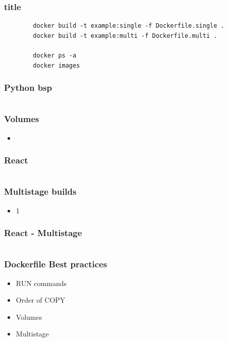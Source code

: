 \documentclass[22pt,handout]{beamer}
\begin{document}
\begin{frame}[fragile]
    \frametitle{title}
    \begin{verbatim}
        docker build -t example:single -f Dockerfile.single .
        docker build -t example:multi -f Dockerfile.multi .

        docker ps -a
        docker images
    \end{verbatim}
\end{frame}

\begin{frame}[fragile]
    \frametitle{Python bsp}
    \inputminted[fontsize=\footnotesize, frame=lines]{dockerfile}{../examples/Dockerfile.cmd}
\end{frame}

\begin{frame}[t]
    \frametitle{Volumes}
    \begin{itemize}
        \item 
    \end{itemize} 
\end{frame}

\begin{frame}[fragile]
    \frametitle{React}
    \inputminted[fontsize=\footnotesize, frame=lines]{dockerfile}{../examples/Dockerfile.cmd}
\end{frame}

\begin{frame}[t]
    \frametitle{Multistage builds}
    \begin{itemize}
        \item 1
    \end{itemize} 
\end{frame}

\begin{frame}[fragile]
    \frametitle{React - Multistage}
    \inputminted[fontsize=\footnotesize, frame=lines]{dockerfile}{../examples/Dockerfile.cmd}
\end{frame}

\begin{frame}[t]
    \frametitle{Dockerfile Best practices}
    \begin{itemize}
        \item RUN commands
        \item Order of COPY
        \item Volumes
        \item Multistage
    \end{itemize} 
\end{frame}
\end{document}
